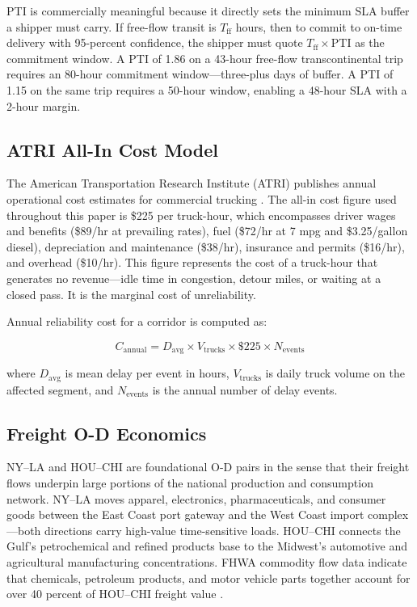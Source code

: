 PTI is commercially meaningful because it directly sets the minimum SLA buffer a shipper must carry. If free-flow transit is $T_{\text{ff}}$ hours, then to commit to on-time delivery with 95-percent confidence, the shipper must quote $T_{\text{ff}} \times \text{PTI}$ as the commitment window. A PTI of 1.86 on a 43-hour free-flow transcontinental trip requires an 80-hour commitment window---three-plus days of buffer. A PTI of 1.15 on the same trip requires a 50-hour window, enabling a 48-hour SLA with a 2-hour margin.

\subsection{ATRI All-In Cost Model}

The American Transportation Research Institute (ATRI) publishes annual operational cost estimates for commercial trucking \citep{ATRI_costs2024}. The all-in cost figure used throughout this paper is \$225 per truck-hour, which encompasses driver wages and benefits (\$89/hr at prevailing rates), fuel (\$72/hr at 7 mpg and \$3.25/gallon diesel), depreciation and maintenance (\$38/hr), insurance and permits (\$16/hr), and overhead (\$10/hr). This figure represents the cost of a truck-hour that generates no revenue---idle time in congestion, detour miles, or waiting at a closed pass. It is the marginal cost of unreliability.

Annual reliability cost for a corridor is computed as:

\begin{equation}
  C_{\text{annual}} = D_{\text{avg}} \times V_{\text{trucks}} \times \$225 \times N_{\text{events}}
  \label{eq:annual_cost}
\end{equation}

where $D_{\text{avg}}$ is mean delay per event in hours, $V_{\text{trucks}}$ is daily truck volume on the affected segment, and $N_{\text{events}}$ is the annual number of delay events.

\subsection{Freight O-D Economics}

NY--LA and HOU--CHI are foundational O-D pairs in the sense that their freight flows underpin large portions of the national production and consumption network. NY--LA moves apparel, electronics, pharmaceuticals, and consumer goods between the East Coast port gateway and the West Coast import complex---both directions carry high-value time-sensitive loads. HOU--CHI connects the Gulf's petrochemical and refined products base to the Midwest's automotive and agricultural manufacturing concentrations. FHWA commodity flow data indicate that chemicals, petroleum products, and motor vehicle parts together account for over 40 percent of HOU--CHI freight value \citep{FHWA_freight2023}.

